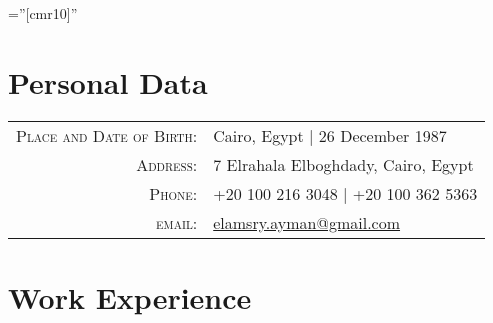 \documentclass[a4paper,11pt]{article} %
\begin{document}
\pagestyle{empty} %

\font\fb=''[cmr10]'' %


\par{\bigskip\par} %

\section{Personal Data}

\begin{tabular}{rl}
\textsc{Place and Date of Birth:} & Cairo, Egypt | 26 December 1987 \\
\textsc{Address:} & 7 Elrahala Elboghdady, Cairo, Egypt \\
\textsc{Phone:} & +20 100 216 3048 | +20 100 362 5363 \\
\textsc{email:} & \href{mailto:elmasry.ayman@gmail.com}{elamsry.ayman@gmail.com}
\end{tabular}


\section{Work Experience}
\end{document}
